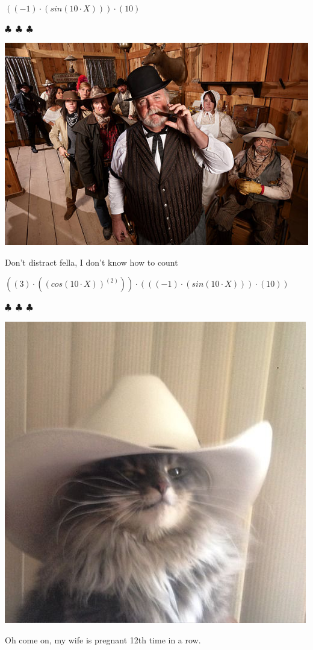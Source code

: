 \documentclass{article}
\begin{document}
\begin{center}$
{{({{({-1})}\cdot{({sin{({{10}\cdot{X}})}})}})}\cdot{({10})}}
$\end{center}
\begin{center} $\clubsuit$~$\clubsuit$~$\clubsuit$ \end{center}\begin{center} \includegraphics[scale=1.4]{funny_pics/funny_bartender.jpg} \end{center} Don't distract fella, I don't know how to count
\begin{center}$
{{({{({3})}\cdot{({{({cos{({{10}\cdot{X}})}})}^{({2})}})}})}\cdot{({{({{({-1})}\cdot{({sin{({{10}\cdot{X}})}})}})}\cdot{({10})}})}}
$\end{center}
\begin{center} $\clubsuit$~$\clubsuit$~$\clubsuit$ \end{center}\begin{center}  \includegraphics[scale=0.3]{funny_pics/cowboy_cat.jpg} \end{center}Oh come on, my wife is pregnant 12th time in a row.
\end{document}
